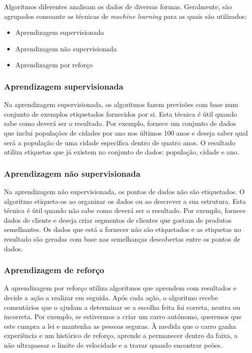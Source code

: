 Algoritmos diferentes analisam os dados de diversas formas.
Geralmente, são agrupados consoante as técnicas de \textit{machine learning} para as quais são utilizados:
\begin{itemize}
  \item Aprendizagem supervisionada
  \item Aprendizagem não supervisionada
  \item Aprendizagem por reforço
\end{itemize}

\subsubsection{Aprendizagem supervisionada}

Na aprendizagem supervisionada, os algoritmos fazem previsões com base num conjunto de exemplos etiquetados fornecidos por si.
Esta técnica é útil quando sabe como deverá ser o resultado.
Por exemplo, fornece um conjunto de dados que inclui populações de cidades por ano nos últimos 100 anos e deseja saber qual será a população de uma cidade específica dentro de quatro anos.
O resultado utiliza etiquetas que já existem no conjunto de dados: população, cidade e ano.

\subsubsection{Aprendizagem não supervisionada}

Na aprendizagem não supervisionada, os pontos de dados não são etiquetados.
O algoritmo etiqueta-os ao organizar os dados ou ao descrever a sua estrutura.
Esta técnica é útil quando não sabe como deverá ser o resultado.
Por exemplo, fornece dados de cliente e deseja criar segmentos de clientes que gostam de produtos semelhantes.
Os dados que está a fornecer não são etiquetados e as etiquetas no resultado são geradas com base nas semelhanças descobertas entre os pontos de dados.

\subsubsection{Aprendizagem de reforço}

A aprendizagem por reforço utiliza algoritmos que aprendem com resultados e decide a ação a realizar em seguida.
Após cada ação, o algoritmo recebe comentários que o ajudam a determinar se a escolha feita foi correta, neutra ou incorreta.
Por exemplo, se estivermos a criar um carro autónomo, queremos que este cumpra a lei e mantenha as pessoas seguras.
À medida que o carro ganha experiência e um histórico de reforço, aprende a permanecer dentro da faixa, a não ultrapassar o limite de velocidade e a travar quando encontrar peões.

